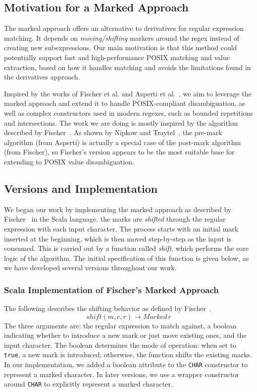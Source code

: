 \documentclass[12pt]{article}
\begin{document}
\subsection{Motivation for a Marked Approach}

The marked approach offers an alternative to derivatives for regular expression matching. It depends on \emph{moving/shifting} markers
around the regex instead of creating new subexpressions. Our main motivation is that this method could potentially support fast and 
high-performance POSIX matching and value extraction, based on how it handles matching and avoids the limitations found in the derivatives approach.

Inspired by the works of Fischer et al. and Asperti et al.~\cite{Fischer2010, Asperti2010}, we aim to leverage the marked approach and extend it to 
handle POSIX-compliant disambiguation, as well as complex constructors used in modern regexes, such as bounded repetitions and intersections. The work
we are doing is mostly inspired by the algorithm described by Fischer~\cite{Fischer2010}. As shown by Nipkow and Traytel~\cite{NipkowTraytel2014}, the
pre-mark algorithm (from Asperti) is actually a special case of the post-mark algorithm (from Fischer), so Fischer’s version appears to be the most 
suitable base for extending to POSIX value disambiguation.


\subsection{Versions and Implementation}

We began our work by implementing the marked approach as described by Fischer~\cite{Fischer2010} in the Scala language.  
the marks are \emph{shifted} through the regular expression with each input character. The process starts with an initial mark inserted 
at the beginning, which is then moved step-by-step as the input is consumed. This is carried out by a function called \emph{shift}, which performs the 
core logic of the algorithm. The initial specification of this function is given below, as we have developed several versions throughout our work.

\subsubsection*{Scala Implementation of Fischer’s Marked Approach}
The following describes the shifting behavior as defined by Fischer~\cite{Fischer2010}.
\[
  shift (m,c,r) \rightarrow Marked\, r
\]
The three arguments are: the regular expression to match against, a boolean indicating whether to introduce a new mark or just move existing ones, and 
the input character. The boolean determines the mode of operation: when set to \texttt{true}, a new mark is introduced; otherwise, the function shifts 
the existing marks. In our implementation, we added a boolean attribute to the \texttt{CHAR} constructor to represent a marked character. In later versions, 
we use a wrapper constructor around \texttt{CHAR} to explicitly represent a marked character.
\end{document}
